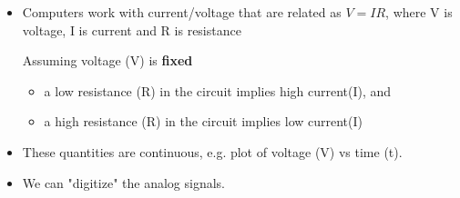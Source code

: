 \setlength{\columnseprule}{1pt}
\def\columnseprulecolor{\color{blue}}


\begin{frame}[fragile]
\begin{itemize}
	\item Computers work with current/voltage that are related as $V = IR$,   where V is voltage, I is current and R is resistance
\begin{tcolorbox}[enhanced,attach boxed title to top center={yshift=-3mm,yshifttext=-1mm},
  colback=blue!5!white,colframe=blue!75!black,colbacktitle=blue!80!black,
  title=Think About It,fonttitle=\bfseries,
  boxed title style={size=small,colframe=red!50!black} ]
    Assuming voltage (V) is \textbf{fixed}
    \begin{itemize}
        \item a low resistance (R) in the circuit implies high current(I), and 
        \item a high resistance (R) in the circuit implies low current(I)
    \end{itemize}
\end{tcolorbox}
    
 \item These quantities are continuous, e.g. plot of voltage (V) vs time (t).


	\item We can "digitize" the analog signals.
\end{itemize}
\end{frame}
\BNotes\ifnum{}
